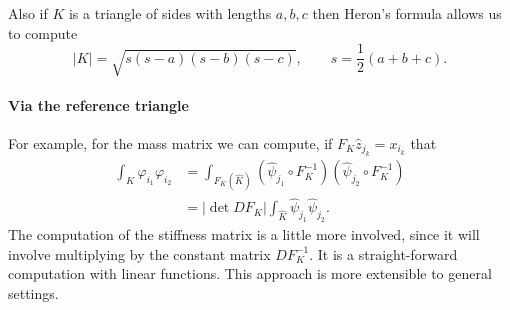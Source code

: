 \bigskip

Also if $K$ is a triangle of sides with lengths $a,b,c$ then Heron's formula allows us to compute
\begin{equation*}
    |K| = \sqrt{s(s-a)(s-b)(s-c)}, \qquad s = \frac 1 2 (a + b + c).
\end{equation*}

\paragraph{Via the reference triangle}
For example, for the mass matrix we can compute, if $F_K \widehat z_{j_k} = x_{i_k}$ that
\begin{align*}
    \int_K \varphi_{i_1} \varphi_{i_2}
     & = \int_{F_K(\widehat K)} (\widehat\psi_{j_1} \circ F_K^{-1}) (\widehat\psi_{j_2} \circ F_K^{-1}) \\
     & = |\det DF_K| \int_{\widehat K} \widehat\psi_{j_1} \widehat\psi_{j_2}.
\end{align*}
The computation of the stiffness matrix is a little more involved, since it will involve multiplying by the constant matrix $DF_K^{-1}$. It is a straight-forward computation with linear functions. This approach is more extensible to general settings.



\nocite{Suli}
\printbibliography[heading=subbibliography]
